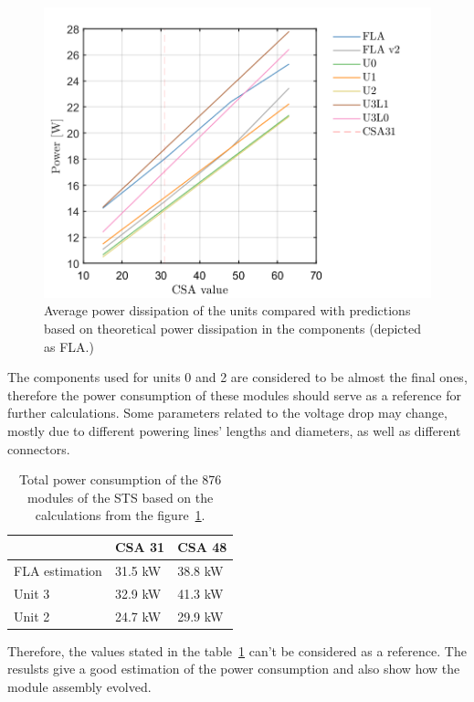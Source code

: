 \begin{figure}[h!]
\centering
\includegraphics[width=0.65\columnwidth]{Chapter6/DCS/images/theor.png}
\caption{Average power dissipation of the units compared with predictions based on theoretical power dissipation in the components (depicted as FLA.)} 
\label{fig_theor}
\end{figure}
The components used for units 0 and 2 are considered to be almost the final ones, therefore the power consumption of these modules should serve as a reference for further calculations. Some parameters related to the voltage drop may change, mostly due to different powering lines' lengths and diameters, as well as different connectors. 
\begin{table}[h!]
\caption{Total power consumption of the 876 modules of the \gls{STS} based on the calculations from the figure~\ref{fig_theor}.}
\centering
\begin{tabular}{lll}
\hline
               & \gls{CSA} 31  & \gls{CSA} 48  \\ \hline
FLA estimation & 31.5 kW & 38.8 kW \\
Unit 3         & 32.9 kW & 41.3 kW \\
Unit 2         & 24.7 kW & 29.9 kW \\ \hline
\end{tabular}

\label{tab:power_cons}
\end{table}
Therefore, the values stated in the table~\ref{tab:power_cons} can't be considered as a reference. The resulsts give a good estimation of the power consumption and also show how the module assembly evolved. 
